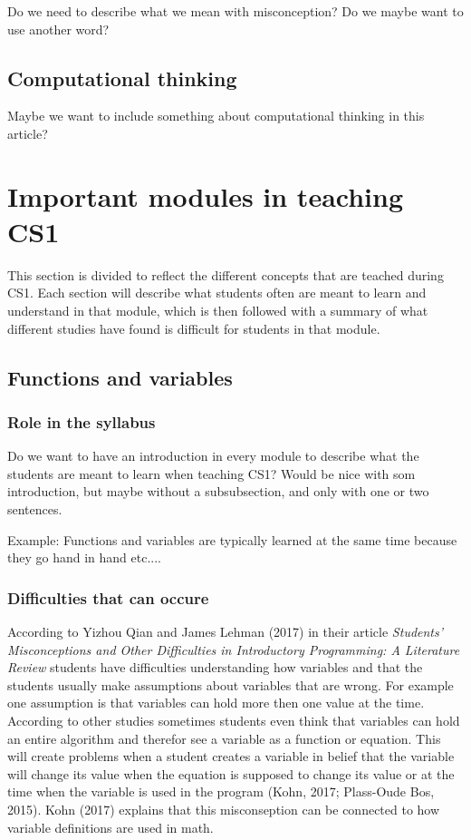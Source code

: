 \documentclass[twocolumn]{article}
\begin{document}
Do we need to describe what we mean with misconception? Do we maybe want to use another word? 

\subsection{Computational thinking}

Maybe we want to include something about computational thinking in this article? 

\section{Important modules in teaching CS1}

This section is divided to reflect the different concepts that are teached during CS1. Each section will describe what students often are meant to learn and understand in that module, which is then followed with a summary of what different studies have found is difficult for students in that module. 

\subsection{Functions and variables}

\subsubsection{Role in the syllabus}

Do we want to have an introduction in every module to describe what the students are meant to learn when teaching CS1? Would be nice with som introduction, but maybe without a subsubsection, and only with one or two sentences. 

Example: Functions and variables are typically learned at the same time because they go hand in hand etc....

\subsubsection{Difficulties that can occure}

According to Yizhou Qian and James Lehman (2017) in their article \emph{Students’ Misconceptions and Other Difficulties in Introductory Programming: A Literature Review} students have difficulties understanding how variables and that the students usually make assumptions about variables that are wrong. For example one assumption is that variables can hold more then one value at the time. According to other studies sometimes students even think that variables can hold an entire algorithm and therefor see a variable as a function or equation. This will create problems when a student creates a variable in belief that the variable will change its value when the equation is supposed to change its value or at the time when the variable is used in the program (Kohn, 2017; Plass-Oude Bos, 2015). Kohn (2017) explains that this misconseption can be connected to how variable definitions are used in math. 
\end{document}
